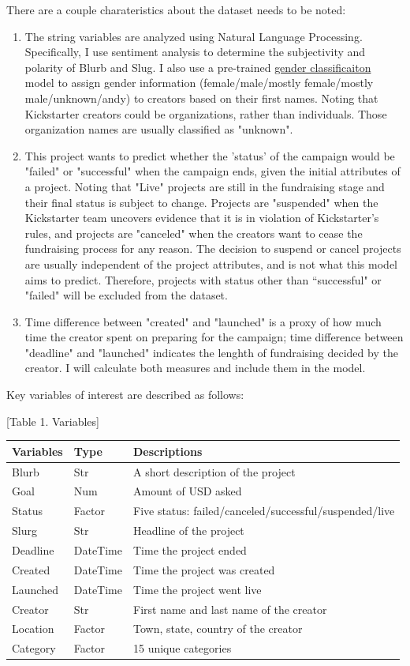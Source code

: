\documentclass[11pt]{article}
\begin{document}
There are a couple charateristics about the dataset needs to be noted:

\begin{enumerate}
\def\labelenumi{\arabic{enumi}.}
\item
  The string variables are analyzed using Natural Language Processing.
  Specifically, I use sentiment analysis to determine the subjectivity
  and polarity of Blurb and Slug. I also use a pre-trained
  \href{https://pypi.org/project/gender-guesser/}{gender classificaiton}
  model to assign gender information (female/male/mostly female/mostly
  male/unknown/andy) to creators based on their first names. Noting that
  Kickstarter creators could be organizations, rather than individuals.
  Those organization names are usually classified as "unknown".
\item
  This project wants to predict whether the 'status' of the campaign
  would be "failed" or "successful" when the campaign ends, given the
  initial attributes of a project. Noting that "Live" projects are still
  in the fundraising stage and their final status is subject to change.
  Projects are "suspended" when the Kickstarter team uncovers evidence
  that it is in violation of Kickstarter's rules, and projects are
  "canceled" when the creators want to cease the fundraising process for
  any reason. The decision to suspend or cancel projects are usually
  independent of the project attributes, and is not what this model aims
  to predict. Therefore, projects with status other than ``successful"
  or "failed" will be excluded from the dataset.
\item
  Time difference between "created" and "launched" is a proxy of how
  much time the creator spent on preparing for the campaign; time
  difference between "deadline" and "launched" indicates the lenghth of
  fundraising decided by the creator. I will calculate both measures and
  include them in the model.
\end{enumerate}

Key variables of interest are described as follows:

{[}Table 1. Variables{]}

\begin{longtable}[]{@{}lll@{}}
\toprule
Variables & Type & Descriptions\tabularnewline
\midrule
\endhead
Blurb & Str & A short description of the project\tabularnewline
Goal & Num & Amount of USD asked\tabularnewline
Status & Factor & Five status:
failed/canceled/successful/suspended/live\tabularnewline
Slurg & Str & Headline of the project\tabularnewline
Deadline & DateTime & Time the project ended\tabularnewline
Created & DateTime & Time the project was created\tabularnewline
Launched & DateTime & Time the project went live\tabularnewline
Creator & Str & First name and last name of the creator\tabularnewline
Location & Factor & Town, state, country of the creator\tabularnewline
Category & Factor & 15 unique categories\tabularnewline
\bottomrule
\end{longtable}
\end{document}
